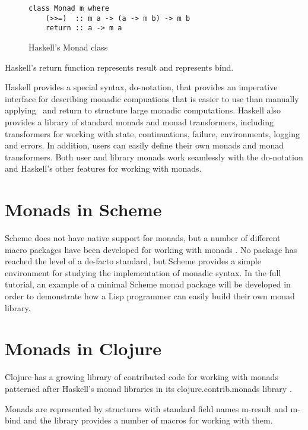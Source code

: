 \documentclass[natbib,10pt]{sigplanconf}
\begin{document}
\begin{figure}
\begin{center}
\begin{verbatim}
class Monad m where
    (>>=)  :: m a -> (a -> m b) -> m b
    return :: a -> m a
\end{verbatim}
\end{center}
\caption{Haskell's Monad class}
\label{fig-Haskell-Monad-class}
\end{figure}

Haskell's {\mono return} function represents {\mono result} and
\hbind \linebreak represents {\mono bind}.

Haskell provides a special syntax, {\mono do}-notation, that provides
an imperative interface for describing monadic compuations that is
easier to use than manually applying \hbind \ and {\mono return}
to structure large monadic computations. Haskell also provides a
library of standard monads and monad transformers, including
transformers for working with state, continuations, failure,
environments, logging and errors.  In addition, users can easily
define their own monads and monad transformers. Both user and
library monads work seamlessly with the {\mono do}-notation and
Haskell's other features for working with monads.

\section{Monads in Scheme}

Scheme does not have native support for monads, but a number of
different macro packages have been developed for working with monads
\citep{scheme-monads}.  No package has reached the level of a de-facto
standard, but Scheme provides a simple environment for studying the
implementation of monadic syntax. In the full tutorial, an example of
a minimal Scheme monad package will be developed in order to
demonstrate how a Lisp programmer can easily build their own monad
library.

\section{Monads in Clojure}

Clojure has a growing library of contributed code for working with
monads patterned after Haskell's monad libraries in its
clojure.contrib.monads library \citep{clojure-monads}.

Monads are represented by structures with standard field names
{\mono m-result} and {\mono m-bind} and the library provides a number of
macros for working with them.
\end{document}
